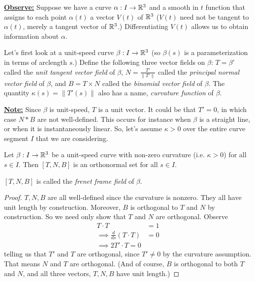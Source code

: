\underline{\textbf{Observe:}} Suppose we have a curve $\alpha: I
\rightarrow \mathbb{R}^3$ and a smooth in $t$ function that assigns to each
point $\alpha(t)$ a vector $V(t)$ of $\mathbb{R}^3$ ($V(t)$ need not be
tangent to $\alpha(t)$, merely a tangent vector of $\mathbb{R}^3$.)
Differentiating $V(t)$ allows us to obtain information about
$\alpha$.

Let's first look at a unit-speed curve $\beta: I \rightarrow \mathbb{R}^3$
(so $\beta(s)$ is a parameterization in terms of arclength $s$.)
Define the following three vector fields on $\beta$: $T = \beta'$
called the \textit{unit tangent vector field} of $\beta$, $N =
\frac{T'}{\|T'\|}$ called the \textit{principal normal vector
  field} of $\beta$, and $B = T \times N$ called the
\textit{binomial vector field} of $\beta$.
The quantity $\kappa(s) = \|T'(s)\|$ also has a name,
\textit{curvature function} of $\beta$.


\underline{\textbf{Note:}} Since $\beta$ is unit-speed, $T$ is a unit
vector. It could be that $T' = 0$, in which case $N * B$ are not
well-defined. This occurs for instance when $\beta$ is a straight
line, or when it is instantaneously linear. So, let's assume $\kappa >
0$ over the entire curve segment $I$ that we are considering.

\begin{theorem}
  Let $\beta: I \rightarrow \mathbb{R}^3$ be a unit-speed curve with
  non-zero curvature (i.e. $\kappa > 0$) for all $s \in I$. Then $[T,
  N, B]$ is an orthonormal set for all $s \in I$.
\end{theorem}
\begin{definition}
  $[T, N, B]$ is called the \textit{frenet frame field} of $\beta$.
\end{definition}
\begin{proof}
$T, N, B$ are all well-defined since the curvature is nonzero. They
all have unit length by construction. Moreover, $B$ is orthogonal to
$T$ and $N$ by construction. So we need only show that $T$ and $N$ are
orthogonal. Observe
\begin{align*}
  T \cdot T &= 1 \\
  \implies \frac{d}{ds} (T \cdot T) &= 0 \\
  \implies 2T' \cdot T = 0
\end{align*}
telling us that $T'$ and $T$ are orthogonal, since $T' \neq 0$ by the
curvature assumption. That means $N$ and $T$ are orthogonal. (And of
course, $B$ is orthogonal to both $T$ and $N$, and all three vectors,
$T, N, B$ have unit length.)
\end{proof}

